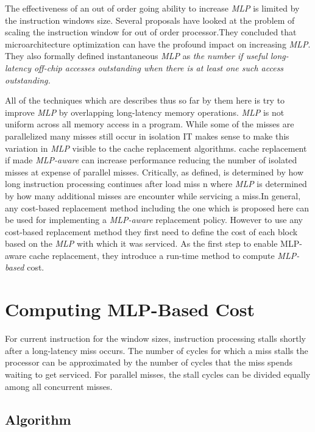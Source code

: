 \documentclass{report}
\begin{document}
The effectiveness of an out of order going ability to increase  \emph {MLP} is limited by the instruction windows size. Several proposals have looked at the problem of scaling the instruction window for out of order processor.They concluded that microarchitecture optimization can have the profound impact on increasing \emph{MLP}. They also formally defined instantaneous \emph{MLP}  as \emph{ the number if useful long-latency off-chip accesses outstanding when there is at least one such access outstanding.}


All of the techniques which are describes thus so far by them here is try to improve \emph{MLP} by overlapping long-latency memory operations. \emph{MLP} is not uniform across all memory access in a program. While some of the misses are parallelized many misses still occur in isolation IT makes sense to make this variation in \emph{MLP} visible to the cache replacement algorithms. cache replacement if made \emph{MLP-aware} can increase performance reducing the number of isolated misses at expense of parallel misses. Critically, as defined, is determined by how long instruction processing continues after load miss n where \emph{MLP} is determined by how many additional misses are encounter while servicing a miss.In general, any cost-based replacement method including the one which is proposed here can be used for implementing a \emph{MLP-aware} replacement policy. However to use any cost-based replacement method they first need to define the cost of each block based on the \emph{MLP} with which it was serviced. As the first step to enable MLP-aware cache replacement, they introduce a run-time method to compute \emph{MLP-based} cost.


\section{ Computing MLP-Based Cost}


For  current instruction for the window sizes, instruction processing stalls shortly after a long-latency miss occurs. The number of cycles for which a miss stalls the processor can be approximated by the number of cycles that the miss spends waiting to get serviced. For parallel misses, the stall cycles can be divided equally among all concurrent misses.


\subsection{ Algorithm}
\end{document}
